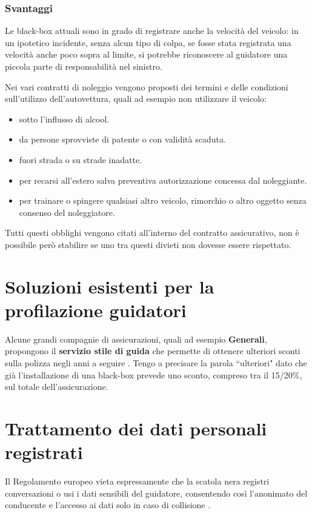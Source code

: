 \documentclass[12pt, a4paper, italian]{report}
\numberwithin{figure}{chapter}
\numberwithin{table}{chapter}
\begin{document}
\subsubsection{Svantaggi}
Le black-box attuali sono in grado di registrare anche la velocità del veicolo: in un ipotetico incidente, senza alcun tipo di colpa, se fosse stata registrata una velocità anche poco sopra al limite, si potrebbe riconoscere al guidatore una piccola parte di responsabilità nel sinistro.

\vspace{1cm}

Nei vari contratti di noleggio \cite{hertz_pdf} vengono proposti dei termini e delle condizioni sull'utilizzo dell'autovettura, quali ad esempio non utilizzare il veicolo: 
\begin{itemize}
    \item  sotto l'influsso di alcool.
    \item da persone sprovviste di patente o con validità scaduta.
    \item fuori strada o su strade inadatte.
    \item per recarsi all'estero salva preventiva autorizzazione concessa dal noleggiante.
    \item per trainare o spingere qualsiasi altro veicolo, rimorchio o altro oggetto senza consenso del noleggiatore.
\end{itemize}
Tutti questi obblighi vengono citati all'interno del contratto assicurativo, non è possibile però stabilire se uno tra questi divieti non dovesse essere rispettato.

\section{Soluzioni esistenti per la profilazione guidatori}
Alcune grandi compagnie di assicurazioni, quali ad esempio \textbf{Generali}, propongono il \textbf{servizio stile di guida} che permette di ottenere ulteriori sconti sulla polizza negli anni a seguire \cite{Generali}. Tengo a precisare la parola ``ulteriori" dato che già l'installazione di una black-box prevede uno sconto, compreso tra il 15/20\%, sul totale dell'assicurazione.

\section{Trattamento dei dati personali registrati}
Il Regolamento europeo vieta espressamente che la scatola nera registri conversazioni o usi i dati sensibili del guidatore, consentendo così l'anonimato del conducente e l'accesso ai dati solo in caso di collisione \cite{RegolamentoEU}.
\end{document}
